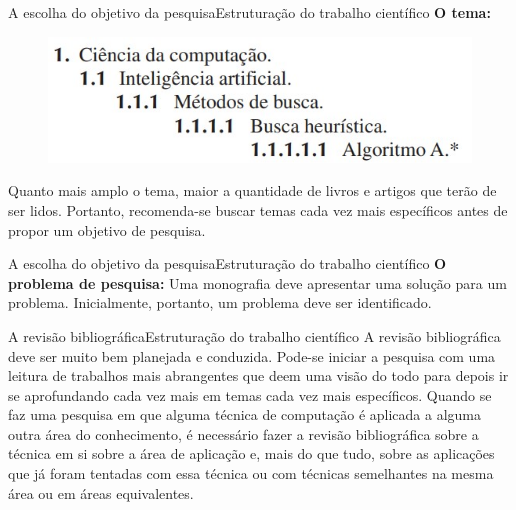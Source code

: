 \documentclass[t]{beamer}
\begin{document}


\begin{ftst}{A escolha do objetivo da pesquisa}{Estruturação do trabalho científico}
\justifying
\textbf{O tema:}
\vone
\begin{figure}
    \centering
    \includegraphics[scale=0.6]{Figuras/03_temas.jpg}
    \label{fig:temas}
\end{figure}
\vone
 Quanto mais amplo o tema, maior a quantidade de livros e artigos que terão de ser lidos. Portanto, recomenda-se buscar temas cada vez mais específicos antes de propor um objetivo de pesquisa.

\end{ftst}


\begin{ftst}{A escolha do objetivo da pesquisa}{Estruturação do trabalho científico}
\justifying
\textbf{O problema de pesquisa:}
\vone
Uma monografia deve apresentar uma solução para um problema. Inicialmente, portanto, um problema deve ser identificado.


\end{ftst}


\begin{ftst}{A revisão bibliográfica}{Estruturação do trabalho científico}
\justifying
A revisão bibliográfica deve ser muito bem planejada e conduzida.
\vone
Pode-se iniciar a pesquisa com uma leitura de trabalhos mais abrangentes que deem uma visão do todo para depois ir se aprofundando cada vez mais em temas cada vez mais específicos.
\vone
Quando se faz uma pesquisa em que alguma técnica de computação é aplicada a alguma outra área do conhecimento, é necessário fazer a revisão bibliográfica sobre a técnica em si sobre a área de aplicação e, mais do que tudo, sobre as aplicações que já foram tentadas com essa técnica ou com técnicas semelhantes na mesma área ou em áreas equivalentes.


\end{ftst}

\end{document}
